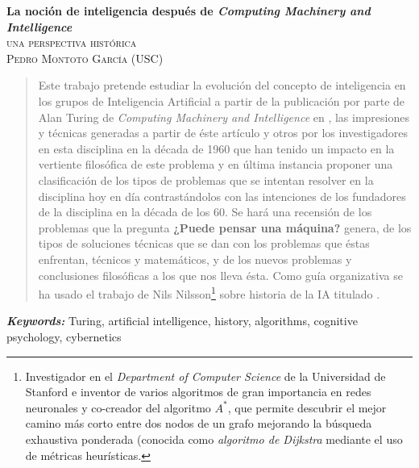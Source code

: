 \documentclass[12pt]{memoir}
\makeatletter
\newlength\drop
\newcommand*\titleM{\begingroup%
\setlength\drop{0.08\textheight}
\centering
\vspace*{\drop}
{\Huge\bfseries La noción de inteligencia después de \textit{Computing Machinery and Intelligence}}\\[\baselineskip]
{\scshape una perspectiva histórica}\\[\baselineskip]
\vfill
{\large\scshape Pedro Montoto García (USC)}\par
\vfill
{\scshape \@date}\par
\vspace*{2\drop}
\endgroup}
\providecommand{\keywords}[1]{\textbf{\textit{Keywords: }} #1}
\makeatother
\begin{document}
\pagestyle{empty}




\begin{titlingpage}
\titleM
\end{titlingpage}




\pagestyle{fancy}
\fancyhf{}
\lhead[]{\thepage}
\rhead[\thepage]{}


\thispagestyle{empty}
\begin{abstract}
	Este trabajo pretende estudiar la evolución del concepto de inteligencia en los grupos de Inteligencia Artificial a partir de la publicación por parte de Alan Turing de \textit{Computing Machinery and Intelligence} en \cite{Turing1950cmi}, las impresiones y técnicas generadas a partir de éste artículo y otros por los investigadores en esta disciplina en la década de 1960 que han tenido un impacto en la vertiente filosófica de este problema y en última instancia proponer una clasificación de los tipos de problemas que se intentan resolver en la disciplina hoy en día contrastándolos con las intenciones de los fundadores de la disciplina en la década de los 60. Se hará una recensión de los problemas que la pregunta \textbf{¿Puede pensar una máquina?} genera, de los tipos de soluciones técnicas que se dan con los problemas que éstas enfrentan, técnicos y matemáticos, y de los nuevos problemas y conclusiones filosóficas a los que nos lleva ésta. Como guía organizativa se ha usado el trabajo de Nils Nilsson\footnote{Investigador en el \textit{Department of Computer Science} de la Universidad de Stanford e inventor de varios algoritmos de gran importancia en redes neuronales y co-creador del algoritmo $A^*$, que permite descubrir el mejor camino más corto entre dos nodos de un grafo mejorando la búsqueda exhaustiva ponderada (conocida como \textit{algoritmo de Dijkstra} mediante el uso de métricas heurísticas.} \parencite{Nilsson2009} sobre historia de la IA titulado .
\end{abstract}
\keywords{Turing, artificial intelligence, history, algorithms, cognitive psychology, cybernetics}
\end{document}
